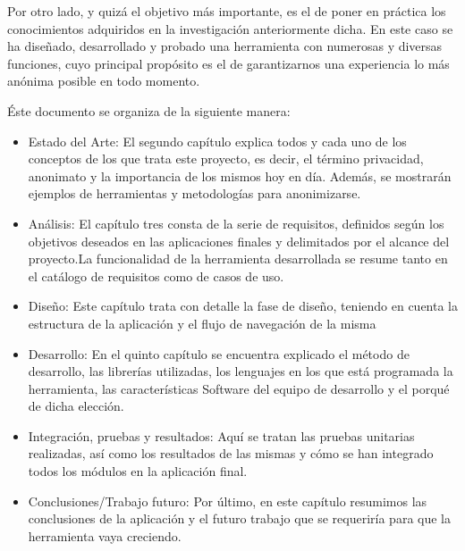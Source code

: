 Por otro lado, y quizá el objetivo más importante, es el de poner en práctica los conocimientos adquiridos en la investigación anteriormente dicha. En este caso se ha diseñado, desarrollado y probado una herramienta con numerosas y diversas funciones, cuyo principal propósito es el de garantizarnos una experiencia lo más anónima posible en todo momento.\\



Éste documento se organiza de la siguiente manera:
\begin{itemize}
	\item Estado  del  Arte: El segundo capítulo explica todos y cada uno de los conceptos de los que trata este proyecto, es decir, el término privacidad, anonimato y la importancia de los mismos hoy en día. Además, se mostrarán ejemplos de herramientas y metodologías para anonimizarse. 
	\item Análisis: El capítulo tres consta de la serie de requisitos, definidos  según  los objetivos  deseados  en  las  aplicaciones  finales  y  delimitados  por  el  alcance  del proyecto.La funcionalidad de la herramienta desarrollada se resume tanto en el catálogo de requisitos como de casos de uso.
	\item Diseño: Este capítulo trata con detalle la fase de diseño, teniendo en cuenta la estructura de la aplicación y el flujo de navegación de la misma 
	\item Desarrollo: En el quinto capítulo se encuentra explicado el método de desarrollo, las librerías utilizadas, los lenguajes en los que está programada la herramienta, las características Software del equipo de desarrollo y el porqué de dicha elección.
	\item Integración, pruebas y resultados: Aquí se tratan las pruebas unitarias realizadas, así como los resultados de las mismas y cómo se han integrado todos los módulos en la aplicación final.
	\item Conclusiones/Trabajo  futuro: Por último, en este capítulo resumimos las conclusiones de la aplicación y el futuro trabajo que se requeriría para que la herramienta vaya creciendo.
\end{itemize}

\newpage \thispagestyle{empty} %